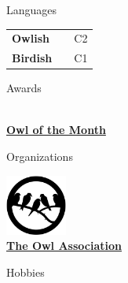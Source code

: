 \documentclass[lightstylish]{stylishcv} %
\begin{document}
	\begin{darkshadedcvbox}Languages\end{darkshadedcvbox}
	\begin{tabular}{l l R{0.4cm}}
		\hspace{-0.45cm}\textbf{Owlish}  &  &\hspace{-0.1cm} C2\\
		\hspace{-0.45cm}\textbf{Birdish} &  \hspace{-0.2cm} & \hspace{-0.1cm}C1\\
	\end{tabular}
	\smallskip

	\begin{darkshadedcvbox}Awards\end{darkshadedcvbox}
	{\footnotesize
		\begin{center}
			\href{}{\Huge {\color{headercolour}\faInstitution}}\\[\baselineskip]\href{https://google.com}{\bfseries Owl of the Month}
		\end{center}}
			\smallskip

	\begin{darkshadedcvbox}Organizations\end{darkshadedcvbox}
	{\footnotesize
	\begin{center}
		\href{}{\includegraphics[width=2cm]{resources/bird-badge.png}}\\[\baselineskip]	\href{https://google.com}{\bfseries The Owl Association}
	\end{center}}
	\smallskip


	\begin{darkshadedcvbox}Hobbies\end{darkshadedcvbox}
	\begin{center}
		\\
	\end{center}
\end{document}
